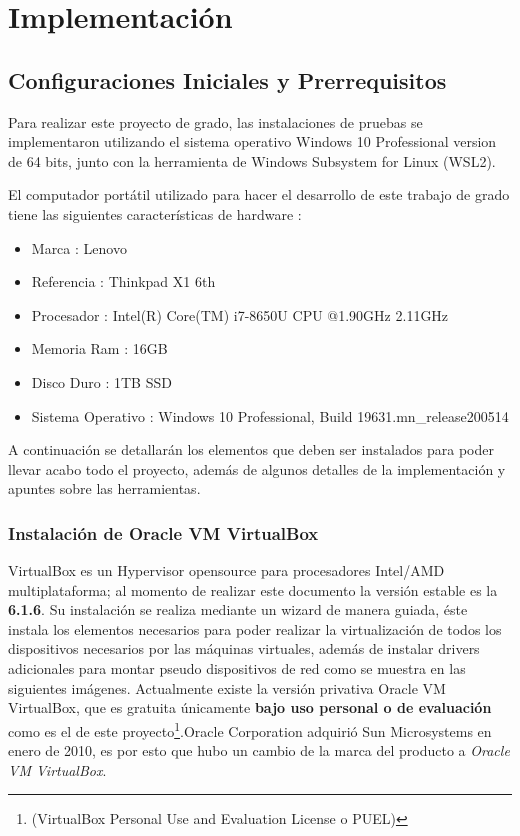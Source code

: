 \documentclass[letterpaper, 12pt, oneside]{article}
\begin{document}
    \section{Implementación}
    \subsection{Configuraciones Iniciales y Prerrequisitos}
    Para realizar este proyecto de grado, las instalaciones de pruebas se implementaron utilizando el sistema operativo Windows 10 Professional version de 64 bits, junto con la herramienta de Windows Subsystem for Linux (WSL2).
    
    El computador portátil utilizado para hacer el desarrollo de este trabajo de grado tiene las siguientes características de hardware : 
    \begin{itemize}
        \item Marca : Lenovo
        \item Referencia : Thinkpad X1 6th
        \item Procesador : Intel(R) Core(TM) i7-8650U CPU @1.90GHz 2.11GHz 
        \item Memoria Ram : 16GB
        \item Disco Duro : 1TB SSD 
        \item Sistema Operativo : Windows 10 Professional, Build 19631.mn\_release200514
    \end{itemize}
    
    A continuación se detallarán los elementos que deben ser instalados para poder llevar acabo todo el proyecto, además de algunos detalles de la implementación y apuntes sobre las herramientas.
    
    \subsubsection{Instalación de Oracle VM VirtualBox}
    VirtualBox es un Hypervisor opensource para procesadores Intel/AMD multiplataforma; al momento de realizar este documento la versión estable es la \textbf{6.1.6}. Su instalación se realiza mediante un wizard de manera guiada, éste instala los elementos necesarios para poder realizar la virtualización de todos los dispositivos necesarios por las máquinas virtuales, además de instalar drivers adicionales para montar pseudo dispositivos de red como se muestra en las siguientes imágenes. 
    Actualmente existe la versión privativa Oracle VM VirtualBox, que es gratuita únicamente \textbf{bajo uso personal o de evaluación} como es el de este proyecto\footnote{(VirtualBox Personal Use and Evaluation License o PUEL)}.Oracle Corporation adquirió Sun Microsystems en enero de 2010, es por esto que hubo un cambio de la marca del producto a \textit{Oracle VM VirtualBox}\cite{oracle}.
    
\end{document}
